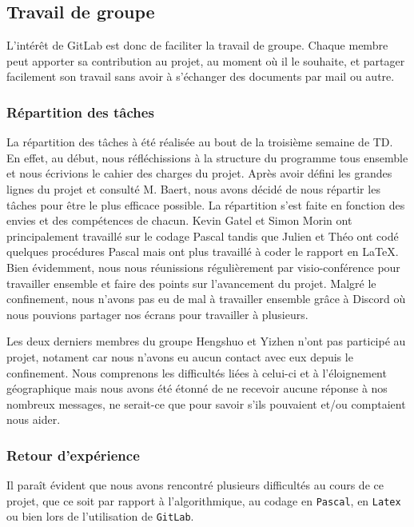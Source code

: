         \clearpage
        
        \subsection{Travail de groupe}
            L'intérêt de GitLab est donc de faciliter la travail de groupe. Chaque membre peut apporter sa contribution au projet, au moment où il le souhaite, et partager facilement son travail sans avoir à s'échanger des documents par mail ou autre.
        
            \subsubsection{Répartition des tâches}
                La répartition des tâches à été réalisée au bout de la troisième semaine de TD. En effet, au début, nous réfléchissions à la structure du programme tous ensemble et nous écrivions le cahier des charges du projet. Après avoir défini les grandes lignes du projet et consulté M. Baert, nous avons décidé de nous répartir les tâches pour être le plus efficace possible. La répartition s'est faite en fonction des envies et des compétences de chacun. Kevin Gatel et Simon Morin ont principalement travaillé sur le codage Pascal tandis que Julien et Théo ont codé quelques procédures Pascal mais ont plus travaillé à coder le rapport en \LaTeX. Bien évidemment, nous nous réunissions régulièrement par visio-conférence pour travailler ensemble et faire des points sur l'avancement du projet. Malgré le confinement, nous n'avons pas eu de mal à travailler ensemble grâce à Discord où nous pouvions partager nos écrans pour travailler à plusieurs. 
                
                Les deux derniers membres du groupe Hengshuo et Yizhen n'ont pas participé au projet, notament car nous n'avons eu aucun contact avec eux depuis le confinement. Nous comprenons les difficultés liées à celui-ci et à l'éloignement géographique mais nous avons été étonné de ne recevoir aucune réponse à nos nombreux messages, ne serait-ce que pour savoir s'ils pouvaient et/ou comptaient nous aider.
        
            \subsubsection{Retour d'expérience}
                Il paraît évident que nous avons rencontré plusieurs difficultés au cours de ce projet, que ce soit par rapport à l'algorithmique, au codage en \verb|Pascal|, en \verb|Latex| ou bien lors de l'utilisation de \verb|GitLab|.
            

